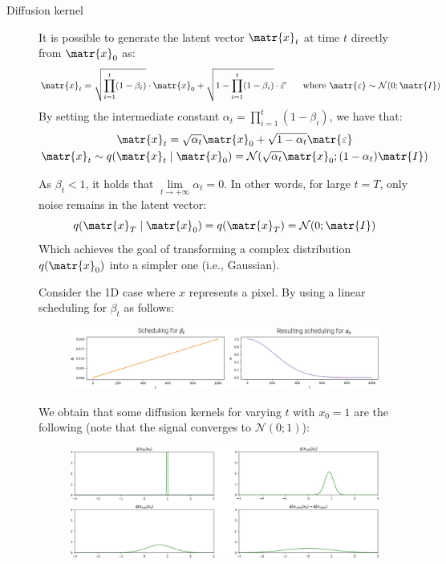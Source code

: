 \begin{description}
    \item[Diffusion kernel] 
        It is possible to generate the latent vector $\matr{x}_t$ at time $t$ directly from $\matr{x}_0$ as:
        \[ \matr{x}_t = \sqrt{\prod_{i=1}^{t}(1-\beta_i)} \cdot \matr{x}_0 + \sqrt{1-\prod_{i=1}^{t}(1-\beta_i)} \cdot \vec{\varepsilon} \qquad \text{where } \matr{\varepsilon} \sim \mathcal{N}(0; \matr{I}) \]
        By setting the intermediate constant $\alpha_t = \prod_{i=1}^{t}(1-\beta_i)$, we have that:
        \[ 
            \begin{gathered}
                \matr{x}_t = \sqrt{\alpha_t} \matr{x}_0 + \sqrt{1-\alpha_t}\matr{\varepsilon} \\
                \matr{x}_t \sim q(\matr{x}_t \mid \matr{x}_0) = \mathcal{N}(\sqrt{\alpha_t}\matr{x}_0; (1-\alpha_t)\matr{I})
            \end{gathered}
        \]

        \begin{remark}
            As $\beta_t < 1$, it holds that $\lim\limits_{t \rightarrow +\infty} \alpha_t = 0$. In other words, for large $t = T$, only noise remains in the latent vector:
            \[ q(\matr{x}_T \mid \matr{x}_0) = q(\matr{x}_T) = \mathcal{N}(0; \matr{I}) \]
            Which achieves the goal of transforming a complex distribution $q(\matr{x}_0)$ into a simpler one (i.e., Gaussian).
        \end{remark}

        \begin{example}
            Consider the 1D case where $x$ represents a pixel. By using a linear scheduling for $\beta_t$ as follows:
            \begin{figure}[H]
                \centering
                \includegraphics[width=0.9\linewidth]{./img/diffusion_kernel_example1.jpg}
            \end{figure}
            We obtain that some diffusion kernels for varying $t$ with $x_0 = 1$ are the following (note that the signal converges to $\mathcal{N}(0; 1)$):
            \begin{figure}[H]
                \centering
                \includegraphics[width=0.9\linewidth]{./img/diffusion_kernel_example2.jpg}
            \end{figure}
        \end{example}


\end{description}
